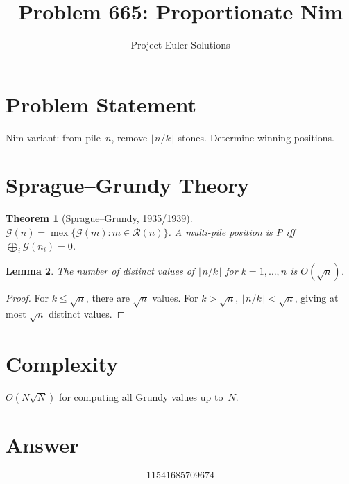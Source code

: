 \documentclass[11pt]{article}
\title{Problem 665: Proportionate Nim}
\author{Project Euler Solutions}
\date{}
\newtheorem{theorem}{Theorem}
\newtheorem{lemma}[theorem]{Lemma}
\begin{document}
\maketitle

\section{Problem Statement}

Nim variant: from pile~$n$, remove $\lfloor n/k \rfloor$ stones. Determine winning positions.

\section{Sprague--Grundy Theory}

\begin{theorem}[Sprague--Grundy, 1935/1939]
$\mathcal{G}(n) = \operatorname{mex}\{\mathcal{G}(m) : m \in \mathcal{R}(n)\}$. A multi-pile position is P iff $\bigoplus_i \mathcal{G}(n_i) = 0$.
\end{theorem}

\begin{lemma}
The number of distinct values of $\lfloor n/k \rfloor$ for $k = 1,\ldots,n$ is $O(\sqrt{n})$.
\end{lemma}

\begin{proof}
For $k \le \sqrt{n}$, there are $\sqrt{n}$ values. For $k > \sqrt{n}$, $\lfloor n/k \rfloor < \sqrt{n}$, giving at most $\sqrt{n}$ distinct values.
\end{proof}

\section{Complexity}

$O(N\sqrt{N})$ for computing all Grundy values up to~$N$.

\section{Answer}

\[
\boxed{11541685709674}
\]
\end{document}
